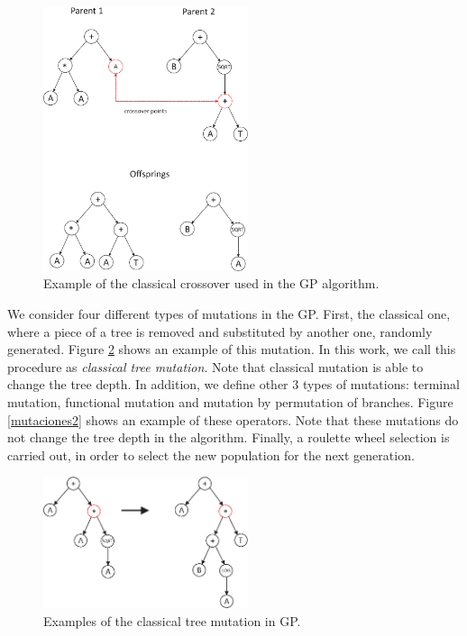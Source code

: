 \begin{figure}[!ht]
\begin{center}
\includegraphics[draft=false,angle=0,width=6cm]{./Cruce_GP.eps}
\end{center}
\caption{\label{Cruce_GP} Example of the classical crossover used in the GP algorithm.}
\end{figure}

We consider four different types of mutations in the GP. First, the classical one, where a piece of a tree is removed and substituted by another one, randomly generated. Figure \ref{classical_mutation_GP} shows an example of this mutation. In this work, we call this procedure as {\em classical tree mutation}. Note that classical mutation is able to change the tree depth. In addition, we define other 3 types of mutations: terminal mutation, functional mutation and mutation by permutation of branches. Figure \ref{mutaciones2} shows an example of these operators. Note that these mutations do not change the tree depth in the algorithm. Finally, a roulette wheel selection is carried out, in order to select the new population for the next generation.

\begin{figure}[!ht]
\begin{center}
\includegraphics[draft=false,angle=0,width=6cm]{./classical_tree_mutation.eps}
\end{center}
\caption{\label{classical_mutation_GP} Examples of the classical tree mutation in GP.}
\end{figure}

